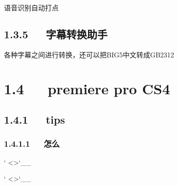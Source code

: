 \documentclass[letterpaper,12pt,english]{sphinxmanual}
\begin{document}
语音识别自动打点


\subsection{1.3.5   字幕转换助手}
\label{\detokenize{001software/001install/adobe:id4}}
各种字幕之间进行转换，还可以把BIG5中文转成GB2312

\begin{sphinxVerbatim}[commandchars=\\\{\}]
\PYGZbs{} \PYGZbs{}
\end{sphinxVerbatim}


\section{1.4   premiere pro CS4}
\label{\detokenize{001software/001install/adobe:premiere-pro-cs4}}

\subsection{1.4.1   tips}
\label{\detokenize{001software/001install/adobe:tips}}

\subsubsection{1.4.1.1   怎么}
\label{\detokenize{001software/001install/adobe:id5}}
` <>`\_\_

` <>`\_\_
\end{document}
